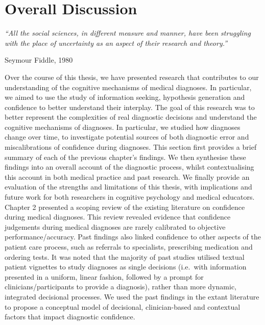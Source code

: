 \documentclass[a4paper, nobind]{templates/ociamthesis}
\begin{document}
\chapter{Overall Discussion}\label{chapter-7}

\adjustmtc
{}

\emph{``All the social sciences, in different measure and manner, have been struggling with the place of uncertainty as an aspect of their research and theory.''}

Seymour Fiddle, 1980

\hfill\break
Over the course of this thesis, we have presented research that contributes to our understanding of the cognitive mechanisms of medical diagnoses. In particular, we aimed to use the study of information seeking, hypothesis generation and confidence to better understand their interplay. The goal of this research was to better represent the complexities of real diagnostic decisions and understand the cognitive mechanisms of diagnoses. In particular, we studied how diagnoses change over time, to investigate potential sources of both diagnostic error and miscalibrations of confidence during diagnoses. This section first provides a brief summary of each of the previous chapter's findings. We then synthesise these findings into an overall account of the diagnostic process, whilst contextualising this account in both medical practice and past research. We finally provide an evaluation of the strengths and limitations of this thesis, with implications and future work for both researchers in cognitive psychology and medical educators.\\

Chapter 2 presented a scoping review of the existing literature on confidence during medical diagnoses. This review revealed evidence that confidence judgements during medical diagnoses are rarely calibrated to objective performance/accuracy. Past findings also linked confidence to other aspects of the patient care process, such as referrals to specialists, prescribing medication and ordering tests. It was noted that the majority of past studies utilised textual patient vignettes to study diagnoses as single decisions (i.e.~with information presented in a uniform, linear fashion, followed by a prompt for clinicians/participants to provide a diagnosis), rather than more dynamic, integrated decisional processes. We used the past findings in the extant literature to propose a conceptual model of decisional, clinician-based and contextual factors that impact diagnostic confidence.\\
\end{document}
